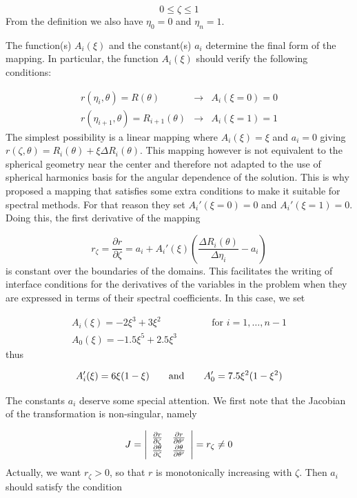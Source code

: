 \[ 0\leq \zeta\leq1\]
From the definition we also have $\eta_0=0$ and $\eta_n=1$.

The function(s) $A_i(\xi)$ and the constant(s) $a_i$ determine the final
form of the mapping. In particular, the function $A_i(\xi)$ should verify
the following conditions:

\begin{eqnarray*}
r(\eta_i,\theta)=R(\theta) &\longrightarrow& A_i(\xi=0)=0\\
r(\eta_{i+1},\theta)=R_{i+1}(\theta) &\longrightarrow& A_i(\xi=1)=1
\end{eqnarray*}
The simplest possibility is a linear mapping where $A_i(\xi)=\xi$ and
$a_i=0$ giving $ r(\zeta,\theta)=R_i(\theta)+\xi\Delta R_i(\theta)$.
This mapping however is not equivalent to the spherical geometry near
the center and therefore not adapted to the use of spherical harmonics
basis for the angular dependence of the solution. This is why 
\citet{BGM98} proposed a mapping that satisfies some
extra conditions to make it suitable for spectral methods. For that
reason they set $A_i'(\xi=0)=0$ and $A_i'(\xi=1)=0$. Doing this, the
first derivative of the mapping

\begin{equation}
r_\zeta=\frac{\partial r}{\partial\zeta}=a_i+A_i'(\xi)\left(\frac{\Delta R_i(\theta)}{\Delta\eta_i}-a_i\right)
\end{equation}
is constant over the boundaries of the domains. This facilitates the
writing of interface conditions for the derivatives of the variables
in the problem when they are expressed in terms of their spectral
coefficients.  In this case, we set

\begin{eqnarray}
\label{eq:map_bonazzola}
A_i(\xi)=-2\xi^3+3\xi^2 &\qquad& \mbox{for $i=1,\ldots,n-1$}\\
A_0(\xi)=-1.5\xi^5+2.5\xi^3&&
\end{eqnarray}
thus

\begin{equation}
A'_i(\xi) = 6\xi(1-\xi) \qquad {\rm and}\qquad A'_0 = 7.5\xi^2(1-\xi^2)
\end{equation}

The constants $a_i$ deserve some special attention. We first note that
the Jacobian of the transformation  is non-singular, namely

\[ J=\left|\begin{array}{cc}
\frac{\partial r}{\partial \zeta} & \frac{\partial r}{\partial\theta'}\\
\frac{\partial \theta}{\partial \zeta} & \frac{\partial\theta}{\partial\theta'}
\end{array}\right| = r_\zeta\neq0\]
Actually, we want $r_\zeta>0$,
so that $r$ is monotonically increasing with $\zeta$. Then $a_i$
should satisfy the condition

